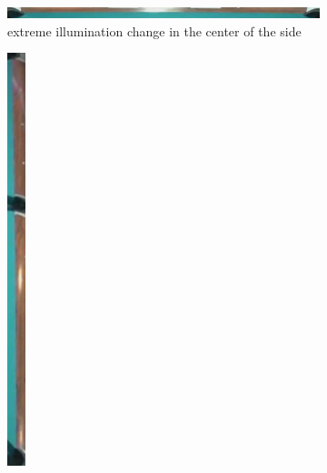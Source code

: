 \begin{figure}
    \centering
    \begin{subfigure}[b]{\textwidth}
    \includegraphics[width=\textwidth]{./imgs/bad_side_illumination_change.png}
    \caption{extreme illumination change in the  center of the side}\par
    \end{subfigure}\vspace{10pt}
    \begin{subfigure}[b]{\textwidth}
    \includegraphics[angle=90, width=\textwidth]{./imgs/bad_side_warp.png}

\end{subfigure}
\end{figure}
